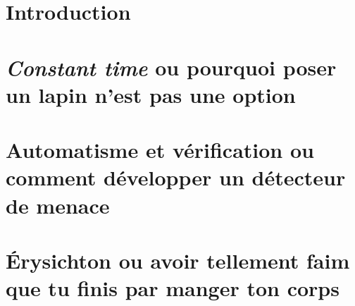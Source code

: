 \documentclass{backend}
\begin{document}
\frontmatter%
\maketitle
\thispagestyle{empty}



\justifying



\cleardoublepage
\tableofcontents

\part{Introduction}




\mainmatter%
\part{\textit{Constant time} ou pourquoi poser un lapin n'est pas une option}




\part{Automatisme et vérification ou comment développer un détecteur de menace}




\part{Érysichton ou avoir tellement faim que tu finis par manger ton corps}




\end{document}
